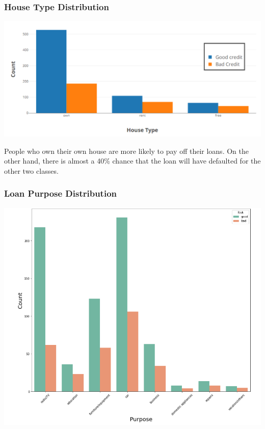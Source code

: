 \documentclass[a4paper, 12pt]{article}
\begin{document}
\subsubsection{House Type Distribution}

\begin{center}
\includegraphics[scale=0.4]{dist-3.png}
\label{fig:dist3}
\end{center}

\noindent People who own their own house are more likely to pay off their loans. On the other hand, there is almost a 40\% chance that the loan will have defaulted for the other two classes.

\subsubsection{Loan Purpose Distribution}

\begin{center}
\includegraphics[scale=0.6]{dist-4.png}
\label{fig:dist4}
\end{center}
\end{document}
